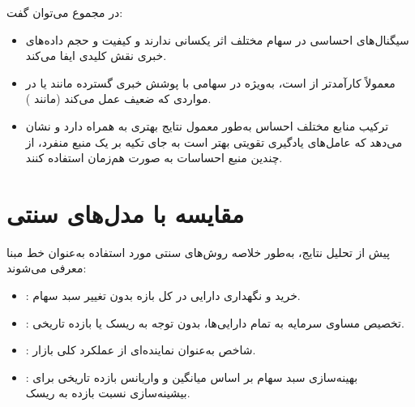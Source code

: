 \documentclass[12pt, a4paper]{report}
\begin{document}
در مجموع می‌توان گفت:  
\begin{itemize}
    \item سیگنال‌های احساسی در سهام مختلف اثر یکسانی ندارند و کیفیت و حجم داده‌های خبری نقش کلیدی ایفا می‌کند.  
    \item {} معمولاً کارآمدتر از  است، به‌ویژه در سهامی با پوشش خبری گسترده مانند  یا در مواردی که  ضعیف عمل می‌کند (مانند ).  
    \item ترکیب منابع مختلف احساس به‌طور معمول نتایج بهتری به همراه دارد و نشان می‌دهد که عامل‌های یادگیری تقویتی بهتر است به جای تکیه بر یک منبع منفرد، از چندین منبع احساسات به صورت هم‌زمان استفاده کنند.  
\end{itemize}


\section{مقایسه با مدل‌های سنتی}

پیش از تحلیل نتایج، به‌طور خلاصه روش‌های سنتی مورد استفاده به‌عنوان خط مبنا معرفی می‌شوند:  
\begin{itemize}
    \item {}: خرید و نگهداری دارایی در کل بازه بدون تغییر سبد سهام.  
    \item {}: تخصیص مساوی سرمایه به تمام دارایی‌ها، بدون توجه به ریسک یا بازده تاریخی.  
    \item {}: شاخص  به‌عنوان نماینده‌ای از عملکرد کلی بازار.  
    \item {}: بهینه‌سازی سبد سهام بر اساس میانگین و واریانس بازده تاریخی برای بیشینه‌سازی نسبت بازده به ریسک.  
\end{itemize}


\begin{table}[H]
\centering
\caption{مقایسه عملکرد مدل پیشنهادی با روش‌های سنتی}
\label{tab:baseline-comparison}
\end{table}
\end{document}
